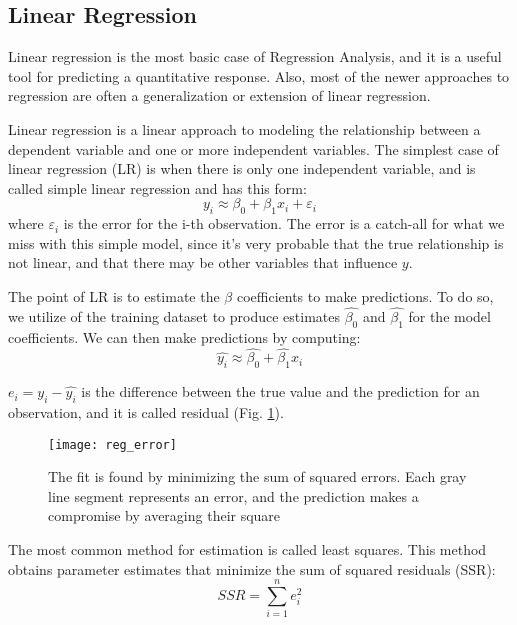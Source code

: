 \subsection{Linear Regression} \label{lin_reg}
Linear regression is the most basic case of Regression Analysis, and it is a useful tool for predicting a quantitative response. Also, most of the newer approaches to regression are often a generalization or extension of linear regression.

Linear regression is a linear approach to modeling the relationship between a dependent variable and one or more independent variables. The simplest case of linear regression (LR) is when there is only one independent variable, and is called simple linear regression \cite{wiki:lin_reg} and has this form:
\begin{equation}
	y_i \approx \beta_0 + \beta_1x_i + \varepsilon_i
\end{equation}
where $\varepsilon_i$ is the error for the i-th observation. The error is a catch-all for what we miss with this simple model, since it's very probable that the true relationship is not linear, and that there may be other variables that influence $y$.

The point of LR is to estimate the $\beta$ coefficients to make predictions. To do so, we utilize of the training dataset to produce estimates $\widehat{\beta_0}$ and $\widehat{\beta_1}$ for the model coefficients. We can then make predictions by computing:
\begin{equation}
	\widehat{y_i} \approx \widehat{\beta_0} + {\widehat{\beta_1}x_i}
\end{equation}

$e_i = y_i - \widehat{y_i}$ is the difference between the true value and the prediction for an observation, and it is called residual (Fig. \ref{fig:reg_error}).

\begin{figure}[H]
	\centering
	\texttt{[image: reg\_error]}
	\caption{The fit is found by minimizing the sum of squared errors. Each gray line segment represents an error, and the prediction makes a compromise by averaging their square \cite{ISLR}}
	\label{fig:reg_error}
\end{figure}

The most common method for estimation is called least squares. This method obtains parameter estimates that minimize the sum of squared residuals (SSR):
\begin{equation}
	SSR=\sum _{i=1}^{n}e_{i}^{2}
\end{equation}

